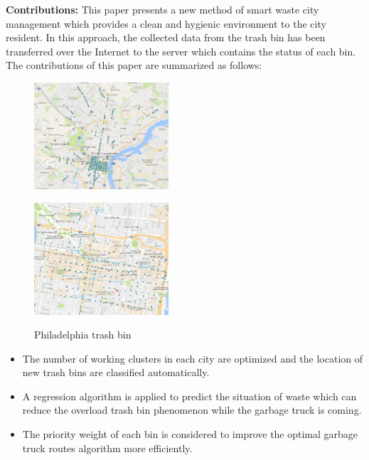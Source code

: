 \documentclass[conference]{IEEEtran}
\begin{document}
\par\textbf{Contributions:} 
This paper presents a new method of smart waste city management which provides a clean and hygienic environment to the city resident. In this approach, the collected data from the trash bin has been transferred over the Internet to the server which contains the status of each bin. The contributions of this paper are summarized as follows:

\begin{figure}
	\centering
	\parbox{5cm}{
		\includegraphics[width=5cm]{overview1}
		\label{fig1a}}
	\qquad
	\begin{minipage}{5cm}
		\includegraphics[width=5cm]{overview3}
		\label{fig1b}
	\end{minipage}
	\caption{Philadelphia trash bin}
	\label{Philadelphia}
\end{figure}

\begin{itemize}
	\item The number of working clusters in each city are optimized and the location of new trash bins are classified automatically. 
	
	\item A regression algorithm is applied to predict the situation of waste which can reduce the overload trash bin phenomenon while the garbage truck is coming.
	
	\item The priority weight of each bin is considered to improve the optimal garbage truck routes algorithm more efficiently.
	
\end{itemize}
\end{document}

